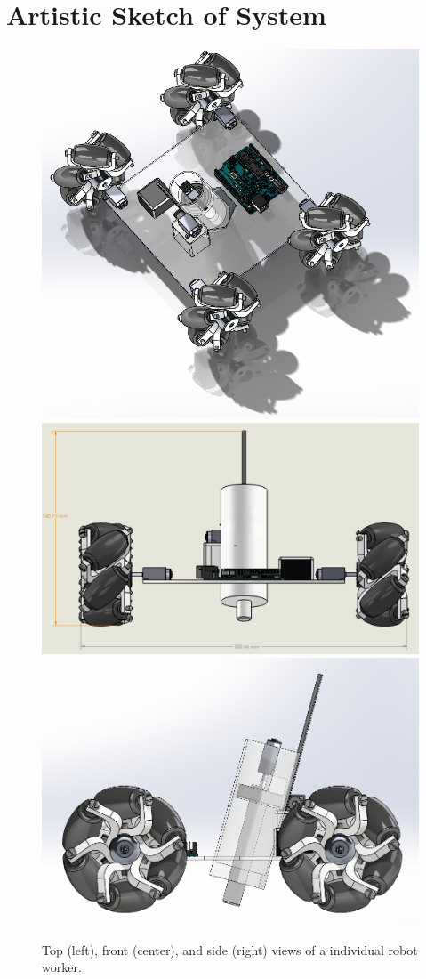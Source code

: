 
\section{Artistic Sketch of System}
\label{sec:artistic_sketch}


\begin{figure}
 \centering
 	\includegraphics[width=0.32\columnwidth]{CAD-screen-shots/full-assembly-5.PNG}
    \includegraphics[width=0.32\columnwidth]{CAD-screen-shots/full-assembly-3.PNG}
    \includegraphics[width=0.32\columnwidth]{CAD-screen-shots/full-assembly-4.PNG}
	\caption{Top (left), front (center), and side (right) views of a individual robot worker.}
 \label{fig:full-robot}
\end{figure}

